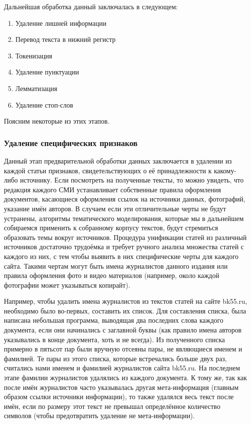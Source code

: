 Дальнейшая обработка данный заключалась в следующем:

\begin{enumerate}
\item Удаление лишней информации
\item Перевод текста в нижний регистр
\item Токенизация
\item Удаление пунктуации
\item Лемматизация
\item Удаление стоп-слов
\end{enumerate}
Поясним некоторые из этих этапов.

\subsubsection{Удаление специфических признаков}
Данный этап предварительной обработки данных заключается в удалении из каждой статьи признаков, свидетельствующих о её принадлежности к какому-либо источнику. Если посмотреть на полученные тексты, то можно увидеть, что редакция каждого СМИ устанавливает собственные правила оформления документов, касающиеся оформления ссылок на источники данных, фотографий, указание имён авторов. В случаем если эти отличительные черты не будут устранены, алгоритмы тематического моделирования, которые мы в дальнейшем собираемся применить к собранному корпусу текстов, будут стремиться образовать темы вокруг источников. Процедура унификации статей из различный источников достаточно трудоёмка и требует ручного анализа множества статей с каждого из них, с тем чтобы выявить в них специфические черты для каждого сайта. Такими чертам могут быть имена журналистов данного издания или правила оформления фото и видео материалов (например, около каждой фотографии может указываться копирайт).

Например, чтобы удалить имена журналистов из текстов статей на сайте bk55.ru, необходимо было во-первых, составить их список. Для составления списка, была написана небольшая программа, выводящая два последних слова каждого документа, если они начинались с заглавной буквы (как правило имена авторов указывались в конце документа, хоть и не всегда). Из полученного списка примерно в пятьсот пар были вручную отсеяны пары, не являющиеся именем и фамилией. Те пары из этого списка, которые встречались больше двух раз, считались нами именем и фамилией журналистов сайта bk55.ru. На последнем этапе фамилии журналистов удалялись из каждого документа. К тому же, так как после имён журналистов часто указывалась другая мета-информация (главным образом ссылки источники информации), то также удалялся весь текст после имён, если по размеру этот текст не превышал определённое количество символов (чтобы предотвратить удаление не мета-информации). 

